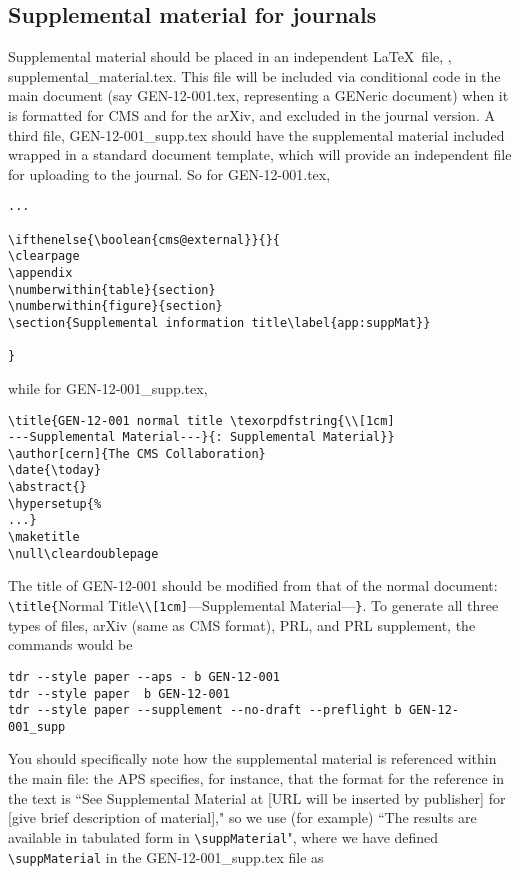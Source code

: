 \subsection{Supplemental material for journals\label{sec:journal-supplements}}
Supplemental material should be placed in an independent \LaTeX\ file, \eg, supplemental\_material.tex. This file will be included via conditional code in the main document (say GEN-12-001.tex, representing a GENeric document) when it is formatted for CMS and for the arXiv, and excluded in the journal version. A third file, GEN-12-001\_supp.tex should have the supplemental material included wrapped in a standard document template, which will provide an independent file for uploading to the journal.
So for GEN-12-001.tex,
\begin{verbatim}
...

\ifthenelse{\boolean{cms@external}}{}{
\clearpage
\appendix
\numberwithin{table}{section}
\numberwithin{figure}{section}
\section{Supplemental information title\label{app:suppMat}}

}
\end{verbatim}
while for GEN-12-001\_supp.tex,
\begin{verbatim}
\title{GEN-12-001 normal title \texorpdfstring{\\[1cm]
---Supplemental Material---}{: Supplemental Material}}
\author[cern]{The CMS Collaboration}
\date{\today}
\abstract{}
\hypersetup{%
...}
\maketitle
\null\cleardoublepage

\end{verbatim}
The title of GEN-12-001 should be modified from that of the normal document: \verb|\title{|Normal Title\verb|\\[1cm]|---Supplemental Material---\verb|}|.
To generate all three types of files, arXiv (same as CMS format), PRL, and PRL supplement, the commands would be
\begin{verbatim}
tdr --style paper --aps - b GEN-12-001
tdr --style paper  b GEN-12-001
tdr --style paper --supplement --no-draft --preflight b GEN-12-001_supp
\end{verbatim}
You should specifically note how the supplemental material is referenced within the main file: the APS specifies, for instance, that the format for the reference in the text is ``See Supplemental Material at [URL will be inserted by publisher] for [give brief description of material]," so we use (for example) ``The results are available in tabulated form in \verb|\suppMaterial|", where we have defined \verb|\suppMaterial| in the GEN-12-001\_supp.tex file as
